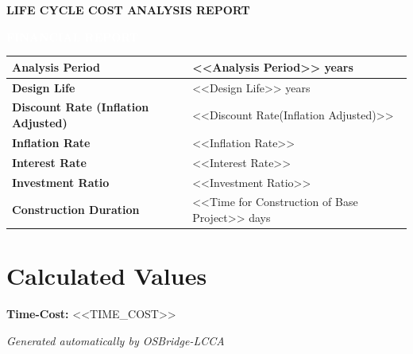 \documentclass[12pt]{article}
\begin{document}
\vspace*{0.6cm}

\begin{center}
\textbf{\fontsize{18pt}{20pt}\selectfont LIFE CYCLE COST ANALYSIS REPORT}
\end{center}

\vspace{0.4cm}

\begin{center}
\colorbox{osgreen}{%
    \parbox{0.8\linewidth}{%
        \centering
        \textcolor{white}{\textbf{FINANCIAL REPORT}}
    }
}
\end{center}

\vspace{0.4cm}

\begin{center}
\begin{tabular}{|p{7cm}|p{5cm}|}
\hline
\textbf{Analysis Period} & <<Analysis Period>> years \\ \hline
\textbf{Design Life} & <<Design Life>> years \\ \hline
\textbf{Discount Rate (Inflation Adjusted)} & <<Discount Rate(Inflation Adjusted)>> \\ \hline
\textbf{Inflation Rate} & <<Inflation Rate>> \\ \hline
\textbf{Interest Rate} & <<Interest Rate>> \\ \hline
\textbf{Investment Ratio} & <<Investment Ratio>> \\ \hline
\textbf{Construction Duration} & <<Time for Construction of Base Project>> days \\ \hline
\end{tabular}
\end{center}

\vspace{0.3cm}

\section*{Calculated Values}
\textbf{Time-Cost:} <<TIME_COST>>

\vfill

{\centering
\textit{Generated automatically by OSBridge-LCCA} \par
}
\end{document}
